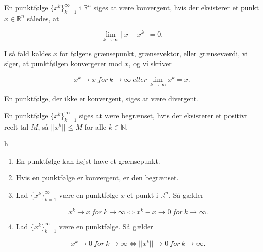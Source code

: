 \begin{definition}
En punktfølge $\{x^k\}^\infty_{k=1}$ i $\mathbb{R}^n$ siges at være konvergent, hvis der eksisterer et punkt $x \in \mathbb{R}^n$ således, at 

\begin{equation}
    \lim_{k \to \infty} ||x-x^k|| = 0.
\end{equation}

I så fald kaldes $x$ for følgens grænsepunkt, grænsevektor, eller grænseværdi, vi siger, at punktfølgen konvergerer mod $x$, og vi skriver

\begin{equation}
    x^k \to x \ for \ k \to \infty \ eller \ \lim_{k \to \infty} x^k = x. 
\end{equation}

En punktfølge, der ikke er konvergent, siges at være divergent. 

\end{definition}

\begin{definition}[]
En punktfølge $\{x^k\}^\infty_{k=1}$ siges at være begrænset, hvis der eksisterer et positivt reelt tal $M$, så $||x^k|| \leq M$ for alle $k\in \mathbb{N}$. 
\end{definition}

\begin{mytheo}{}
h
\begin{enumerate}[label=(\alph*)]
    \item En punktfølge kan højst have et grænsepunkt. 
    \item Hvis en punktfølge er konvergent, er den begrænset. 
    \item Lad $\{x^k\}^\infty_{k=1}$ være en punktfølge $x$ et punkt i $\mathbb{R}^n$. Så gælder
    
    \begin{equation}
        x^k \to x \ for \ k \to \infty \Leftrightarrow x^k-x \to 0 \ for \ k \to \infty.
    \end{equation}
    
    \item Lad $\{x^k\}^\infty_{k=1}$ være en punktfølge. Så gælder
    
    \begin{equation}
        x^k \to 0 \ for \ k \to \infty \Leftrightarrow ||x^k|| \to 0 \ for \ k \to \infty.
    \end{equation}
    
\end{enumerate}

\end{mytheo}


